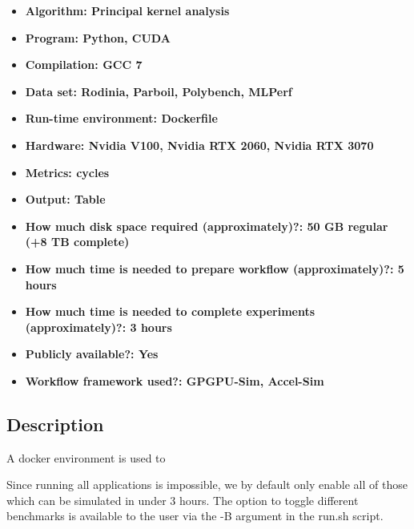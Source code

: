 \documentclass{sigplanconf}
\begin{document}
{\small
\begin{itemize}
  \item {\bf Algorithm: Principal kernel analysis}
  \item {\bf Program: Python, CUDA}
  \item {\bf Compilation: GCC 7}
  \item {\bf Data set: Rodinia, Parboil, Polybench, MLPerf }
  \item {\bf Run-time environment: Dockerfile }
  \item {\bf Hardware: Nvidia V100, Nvidia RTX 2060, Nvidia RTX 3070}
  \item {\bf Metrics: cycles}
  \item {\bf Output: Table }
  \item {\bf How much disk space required (approximately)?: 50 GB regular (+8 TB complete)}
  \item {\bf How much time is needed to prepare workflow (approximately)?: 5 hours }
  \item {\bf How much time is needed to complete experiments (approximately)?: 3 hours }
  \item {\bf Publicly available?: Yes}
  \item {\bf Workflow framework used?: GPGPU-Sim, Accel-Sim}
\end{itemize}

\subsection{Description}
A docker environment is used to 

Since running all applications is impossible, we by default only enable all of 
those which can be simulated in under 3 hours. The option to toggle different benchmarks is available
to the user via the -B argument in the run.sh script.

}
\end{document}
